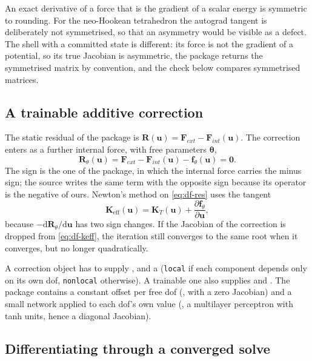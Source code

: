 An exact derivative of a force that is the gradient of a scalar energy is symmetric to rounding. For the neo-Hookean tetrahedron the autograd tangent is deliberately not symmetrised, so that an asymmetry would be visible as a defect. The shell with a committed state is different: its force is not the gradient of a potential, so its true Jacobian is asymmetric, the package returns the symmetrised matrix by convention, and the check below compares symmetrised matrices.

\subsection{A trainable additive correction}\label{sec:df-corr}

The static residual of the package is $\bm R(\bm u)=\bm F_{ext}-\bm F_{int}(\bm u)$. The correction enters as a further internal force, with free parameters $\bm\theta$,
\begin{equation}\label{eq:df-res}
\bm R_\theta(\bm u)=\bm F_{ext}-\bm F_{int}(\bm u)-\bm f_\theta(\bm u)=\bm 0 .
\end{equation}
The sign is the one of the package, in which the internal force carries the minus sign; the source writes the same term with the opposite sign because its operator is the negative of ours. Newton's method on \eqref{eq:df-res} uses the tangent
\begin{equation}\label{eq:df-keff}
\bm K_{\mathrm{eff}}(\bm u)=\bm K_T(\bm u)+\frac{\partial\bm f_\theta}{\partial\bm u},
\end{equation}
because $-\mathrm d\bm R_\theta/\mathrm d\bm u$ has two sign changes. If the Jacobian of the correction is dropped from \eqref{eq:df-keff}, the iteration still converges to the same root when it converges, but no longer quadratically.

A correction object has to supply ,  and a  (\texttt{local} if each component depends only on its own dof, \texttt{nonlocal} otherwise). A trainable one also supplies  and . The package contains a constant offset per free dof (, with a zero Jacobian) and a small network applied to each dof's own value (, a multilayer perceptron with tanh units, hence a diagonal Jacobian).

\subsection{Differentiating through a converged solve}\label{sec:df-adjoint}

